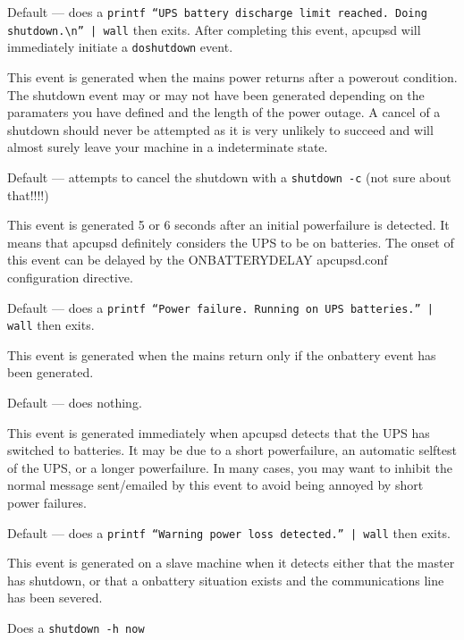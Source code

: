 {{{{{{\begin{description}
Default {---} does a {\tt printf ``UPS battery discharge limit reached. Doing
shutdown.\textbackslash{}n'' | wall} then exits.  After completing this event,
apcupsd will immediately initiate a {\tt doshutdown} event.  

\item [mainsback]
   This event is generated when the mains power returns after a powerout
condition. The shutdown event may or may not have been generated depending on
the paramaters you have defined and the length of the power outage. A cancel
of a shutdown should never be attempted as it is very unlikely to succeed and
will almost surely leave your machine in a indeterminate state.  

Default {---} attempts to cancel the shutdown with a {\tt shutdown -c} (not
sure about that!!!!)  

\item [onbattery]
   This event is generated 5 or 6 seconds after an initial powerfailure is
detected. It means that apcupsd definitely considers the UPS to be on
batteries. The onset of this event can be delayed by the ONBATTERYDELAY
apcupsd.conf configuration directive.  

Default {---} does a {\tt printf ``Power failure. Running on UPS batteries.''
| wall} then exits.  

\item [offbattery]
   This event is generated when the mains return only if the onbattery event has
been generated.  

Default {---} does nothing.  

\item [powerout]
   This event is generated immediately when apcupsd detects that the UPS has
switched to batteries. It may be due to a short powerfailure, an automatic
selftest of the UPS, or a longer powerfailure. In many cases, you may want to
inhibit the normal message sent/emailed by this event to avoid being annoyed
by short power failures.  

Default {---} does a {\tt printf ``Warning power loss detected.'' | wall} then
exits.  

\item [remotedown]
   This event is generated on a slave machine when it detects either that the
master has shutdown, or that a onbattery situation exists and the
communications line has been severed.  

Does a {\tt shutdown -h now}  


\end{description}}}}}}}
